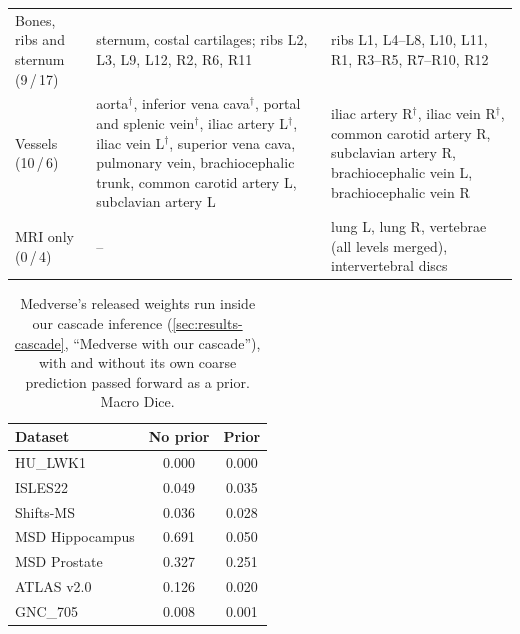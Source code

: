 \begin{table}[p]
\begin{tabularx}{\linewidth}{@{}p{3.2cm}XX@{}}
    \addlinespace
    Bones, ribs and sternum (9\,/\,17)
      & sternum, costal cartilages; ribs L2, L3, L9, L12, R2, R6, R11
      & ribs L1, L4--L8, L10, L11, R1, R3--R5, R7--R10, R12 \\
    \addlinespace
    Vessels (10\,/\,6)
      & aorta$^\dagger$, inferior vena cava$^\dagger$, portal and splenic
        vein$^\dagger$, iliac artery L$^\dagger$, iliac vein L$^\dagger$,
        superior vena cava, pulmonary vein, brachiocephalic trunk, common
        carotid artery L, subclavian artery L
      & iliac artery R$^\dagger$, iliac vein R$^\dagger$, common carotid
        artery R, subclavian artery R, brachiocephalic vein L,
        brachiocephalic vein R \\
    \midrule
    MRI only (0\,/\,4)
      & --
      & lung L, lung R, vertebrae (all levels merged), intervertebral discs \\
    \bottomrule
  \end{tabularx}
\end{table}


\begin{table}[t]
  \centering
  \small
  \caption{Medverse's released weights run inside our cascade inference
  (\autoref{sec:results-cascade}, ``Medverse with our cascade''), with and
  without its own coarse prediction passed forward as a prior. Macro Dice.}
  \label{tab:medverse-prior-appendix}
  \begin{tabular}{@{}lcc@{}}
    \toprule
    Dataset & No prior & Prior \\
    \midrule
    HU\_LWK1        & 0.000 & 0.000 \\
    ISLES22         & 0.049 & 0.035 \\
    Shifts-MS       & 0.036 & 0.028 \\
    MSD Hippocampus & 0.691 & 0.050 \\
    MSD Prostate    & 0.327 & 0.251 \\
    ATLAS v2.0      & 0.126 & 0.020 \\
    GNC\_705        & 0.008 & 0.001 \\
    \bottomrule
  \end{tabular}
\end{table}




